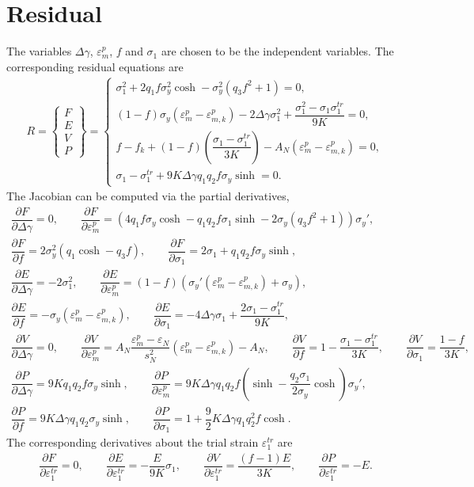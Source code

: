 \documentclass[10pt,fleqn,3p]{elsarticle}
\newcommand*{\pfrac}[2]{\dfrac{\partial#1}{\partial#2}}
\begin{document}
\section{Residual}
The variables $\Delta\gamma$, $\varepsilon^p_m$, $f$ and $\sigma_1$ are chosen to be the independent variables. The corresponding residual equations are
\begin{gather}
R=\begin{Bmatrix}
F\\E\\V\\P
\end{Bmatrix}=\left\{\begin{array}{l}
\sigma_1^2+2q_1f\sigma_y^2\cosh-\sigma_y^2\left(q_3f^2+1\right)=0,\\
\left(1-f\right)\sigma_y\left(\varepsilon^p_m-\varepsilon^p_{m,k}\right)-2\Delta\gamma\sigma_1^2+\dfrac{\sigma_1^2-\sigma_1\sigma_1^{tr}}{9K}=0,\\
f-f_k+\left(1-f\right)\left(\dfrac{\sigma_1-\sigma_1^{tr}}{3K}\right)-A_N\left(\varepsilon^p_m-\varepsilon^p_{m,k}\right)=0,\\[4mm]
\sigma_1-\sigma_1^{tr}+9K\Delta\gamma{}q_1q_2f\sigma_y\sinh=0.
\end{array}\right.
\end{gather}
The Jacobian can be computed via the partial derivatives,
\begin{gather*}
\pfrac{F}{\Delta\gamma}=0,\qquad
\pfrac{F}{\varepsilon^p_m}=\left(4q_1f\sigma_y\cosh-q_1q_2f\sigma_1\sinh-2\sigma_y\left(q_3f^2+1\right)\right)\sigma_y',\\
\pfrac{F}{f}=2\sigma_y^2\left(q_1\cosh-q_3f\right),\qquad
\pfrac{F}{\sigma_1}=2\sigma_1+q_1q_2f\sigma_y\sinh,\\
\pfrac{E}{\Delta\gamma}=-2\sigma_1^2,\qquad
\pfrac{E}{\varepsilon^p_m}=\left(1-f\right)\left(\sigma_y'\left(\varepsilon^p_m-\varepsilon^p_{m,k}\right)+\sigma_y\right),\\
\pfrac{E}{f}=-\sigma_y\left(\varepsilon^p_m-\varepsilon^p_{m,k}\right),\qquad
\pfrac{E}{\sigma_1}=-4\Delta\gamma\sigma_1+\dfrac{2\sigma_1-\sigma_1^{tr}}{9K},\\
\pfrac{V}{\Delta\gamma}=0,\qquad
\pfrac{V}{\varepsilon^p_m}=A_N\dfrac{\varepsilon^p_m-\varepsilon_N}{s_N^2}\left(\varepsilon^p_m-\varepsilon^p_{m,k}\right)-A_N,\qquad
\pfrac{V}{f}=1-\dfrac{\sigma_1-\sigma_1^{tr}}{3K},\qquad
\pfrac{V}{\sigma_1}=\dfrac{1-f}{3K},\\
\pfrac{P}{\Delta\gamma}=9Kq_1q_2f\sigma_y\sinh,\qquad
\pfrac{P}{\varepsilon^p_m}=9K\Delta\gamma{}q_1q_2f\left(\sinh-\dfrac{q_2\sigma_1}{2\sigma_y}\cosh\right)\sigma_y',\\
\pfrac{P}{f}=9K\Delta\gamma{}q_1q_2\sigma_y\sinh,\qquad
\pfrac{P}{\sigma_1}=1+\dfrac{9}{2}K\Delta\gamma{}q_1q_2^2f\cosh.
\end{gather*}
The corresponding derivatives about the trial strain $\varepsilon_1^{tr}$ are
\begin{gather*}
\pfrac{F}{\varepsilon_1^{tr}}=0,\qquad
\pfrac{E}{\varepsilon_1^{tr}}=-\dfrac{E}{9K}\sigma_1,\qquad
\pfrac{V}{\varepsilon_1^{tr}}=\dfrac{\left(f-1\right)E}{3K},\qquad
\pfrac{P}{\varepsilon_1^{tr}}=-E.
\end{gather*}
\end{document}
